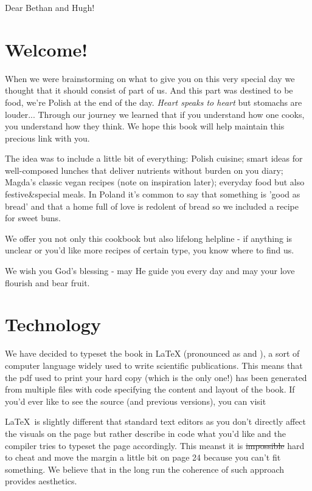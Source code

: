 
Dear Bethan and Hugh!

\section*{Welcome!}
When we were brainstorming on what to give you on this very special day we thought that it should consist of part of us.
And this part was destined to be food, we're Polish at the end of the day.
\textit{Heart speaks to heart} but stomachs are louder...
Through our journey we learned that if you understand how one cooks, you understand how they think.
We hope this book will help maintain this precious link with you.

The idea was to include a little bit of everything: Polish cuisine;
smart ideas for well-composed lunches that deliver nutrients without burden on you diary;
Magda's classic vegan recipes (note on inspiration later);
everyday food but also festive\&special meals.
In Poland it's common to say that something is 'good as bread' and that a home full of love is redolent of bread so we included a recipe for sweet buns.

We offer you not only this cookbook but also lifelong helpline - if anything is unclear or you'd like more recipes of certain type,
you know where to find us.

We wish you God's blessing - may He guide you every day and may your love flourish and bear fruit.

\section*{Technology}
We have decided to typeset the book in \LaTeX{} (pronounced as  and ),
a sort of computer language widely used to write scientific publications.
This means that the pdf used to print your hard copy (which is the only one!)
has been generated from multiple files with code specifying the content and layout
of the book.
If you'd ever like to see the source (and previous versions),
you can visit 

\LaTeX{}~is slightly different that standard text editors as you don't directly affect the visuals
on the page but rather describe in code what you'd like and the compiler tries to
typeset the page accordingly.
This meanst it is \sout{impossible} hard to cheat and
move the margin a little bit on page 24 because you can't fit something.
We believe that in the long run the coherence of such approach provides aesthetics.

